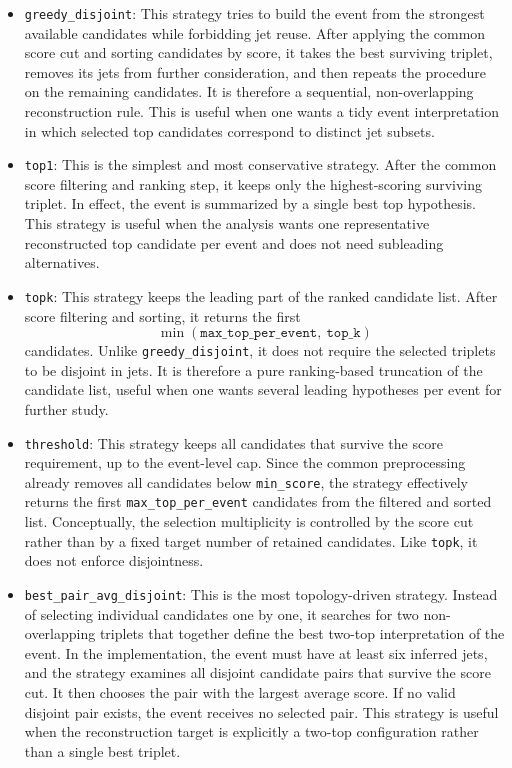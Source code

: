 \begin{itemize}
  \item \texttt{greedy\_disjoint}: This strategy tries to build the event from the strongest available candidates while forbidding jet reuse. After applying the common score cut and sorting candidates by score, it takes the best surviving triplet, removes its jets from further consideration, and then repeats the procedure on the remaining candidates. It is therefore a sequential, non-overlapping reconstruction rule. This is useful when one wants a tidy event interpretation in which selected top candidates correspond to distinct jet subsets.

  \item \texttt{top1}: This is the simplest and most conservative strategy. After the common score filtering and ranking step, it keeps only the highest-scoring surviving triplet. In effect, the event is summarized by a single best top hypothesis. This strategy is useful when the analysis wants one representative reconstructed top candidate per event and does not need subleading alternatives.

  \item \texttt{topk}: This strategy keeps the leading part of the ranked candidate list. After score filtering and sorting, it returns the first
  \[
  \min(\texttt{max\_top\_per\_event},\ \texttt{top\_k})
  \]
  candidates. Unlike \texttt{greedy\_disjoint}, it does not require the selected triplets to be disjoint in jets. It is therefore a pure ranking-based truncation of the candidate list, useful when one wants several leading hypotheses per event for further study.

  \item \texttt{threshold}: This strategy keeps all candidates that survive the score requirement, up to the event-level cap. Since the common preprocessing already removes all candidates below \texttt{min\_score}, the strategy effectively returns the first \texttt{max\_top\_per\_event} candidates from the filtered and sorted list. Conceptually, the selection multiplicity is controlled by the score cut rather than by a fixed target number of retained candidates. Like \texttt{topk}, it does not enforce disjointness.

  \item \texttt{best\_pair\_avg\_disjoint}: This is the most topology-driven strategy. Instead of selecting individual candidates one by one, it searches for two non-overlapping triplets that together define the best two-top interpretation of the event. In the implementation, the event must have at least six inferred jets, and the strategy examines all disjoint candidate pairs that survive the score cut. It then chooses the pair with the largest average score. If no valid disjoint pair exists, the event receives no selected pair. This strategy is useful when the reconstruction target is explicitly a two-top configuration rather than a single best triplet.
\end{itemize}
